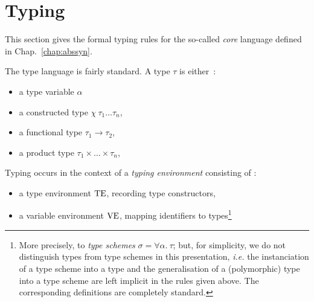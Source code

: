 
\chapter{Typing}
\label{chap:typing}

\newcommand{\sy}[1]{\mathbf{#1}}
\newcommand{\sem}[1]{\mathsf{#1}}


This section gives the formal typing rules for the so-called \emph{core} \hocl language defined in
Chap.~\ref{chap:abssyn}. 

\medskip
The type language is fairly standard. A type $\tau$ is either~:
\begin{itemize}
\item a type variable $\alpha$
\item a constructed type $\chi\ \tau_1 \ldots \tau_n$, 
\item a functional type $\tau_1 \rightarrow \tau_2$,
\item a product type $\tau_1 \times \ldots \times \tau_n$,
\end{itemize}

\medskip
Typing occurs in the context of a \emph{typing environment} consisting of :
\begin{itemize}
\item a type environment $\text{TE}$, recording type constructors,
\item a variable environment $\text{VE}$, mapping identifiers to types\footnote{More precisely, to \emph{type
      schemes} $\sigma=\forall \alpha.\ \tau$; but, for simplicity, we do not distinguish types from type schemes
      in this presentation, \emph{i.e.} the instanciation of a type scheme into a type and the
      generalisation of a (polymorphic) type into a type scheme are left implicit in the rules given
      above. The corresponding definitions are completely standard.}
\end{itemize}

